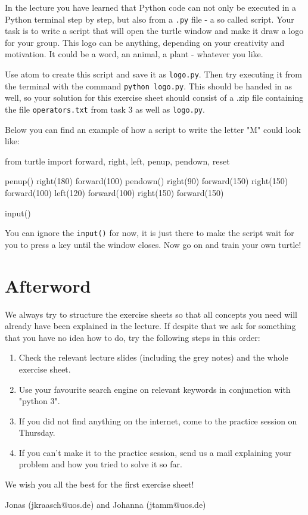 \noindent In the lecture you have learned that Python code can not only be executed in a Python terminal step by step, but also from a \texttt{.py} file - a so called script. Your task is to write a script that will open the turtle window and make it draw a logo for your group. This logo can be anything, depending on your creativity and motivation. It could be a word, an animal, a plant - whatever you like.

\vspace{1em}

\noindent Use atom to create this script and save it as \texttt{logo.py}. Then try executing it from the terminal with the command \texttt{python logo.py}. This should be handed in as well, so your solution for this exercise sheet should consist of a .zip file containing the file \texttt{operators.txt} from task 3 as well as \texttt{logo.py}.

\noindent Below you can find an example of how a script to write the letter "M" could look like:

\begin{pythoncode}

from turtle import forward, right, left, penup, pendown, reset

penup()
right(180)
forward(100)
pendown()
right(90)
forward(150)
right(150)
forward(100)
left(120)
forward(100)
right(150)
forward(150)

input()

\end{pythoncode}

\noindent You can ignore the \texttt{input()} for now, it is just there to make the script wait for you to press a key until the window closes. Now go on and train your own turtle!

\newpage

\section*{Afterword}

\noindent We always try to structure the exercise sheets so that all concepts you need will already have been explained in the lecture. If despite that we ask for something that you have no idea how to do, try the following steps in this order:

\begin{enumerate}

\item Check the relevant lecture slides (including the grey notes) and the whole exercise sheet.
\item Use your favourite search engine on relevant keywords in conjunction with "python 3".
\item If you did not find anything on the internet, come to the practice session on Thursday.
\item If you can't make it to the practice session, send us a mail explaining your problem and how you tried to solve it so far.

\end{enumerate}

\vspace{1em}

\noindent We wish you all the best for the first exercise sheet!

\vspace{1em}

\noindent Jonas (jkraasch@uos.de) and Johanna (jtamm@uos.de)




